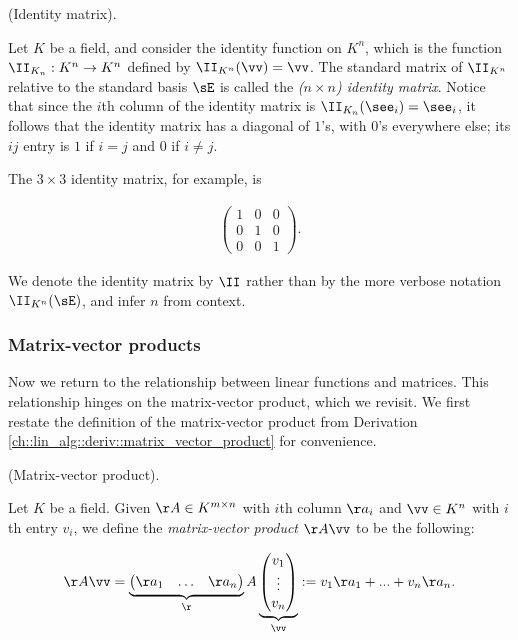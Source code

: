 \begin{defn}
    (Identity matrix).
    
    Let $K$ be a field, and consider the identity function on $K^n$, which is the function $\II_{K_n}:K^n \rightarrow K^n$ defined by $\II_{K^n}(\vv) = \vv$. The standard matrix of $\II_{K^n}$ relative to the standard basis $\sE$ is called the \textit{($n \times n$) identity matrix}. Notice that since the $i$th column of the identity matrix is $\II_{K_n}(\see_i) = \see_i$, it follows that the identity matrix has a diagonal of $1$'s, with $0$'s everywhere else; its $ij$ entry is $1$ if $i = j$ and $0$ if $i \neq j$. 
    
    The $3 \times 3$ identity matrix, for example, is
    
    \begin{align*}
        \begin{pmatrix}
            1 & 0 & 0 \\
            0 & 1 & 0 \\
            0 & 0 & 1
        \end{pmatrix}.
    \end{align*}
    
    We denote the identity matrix by $\II$ rather than by the more verbose notation $\II_{K^n}(\sE)$, and infer $n$ from context.
\end{defn}

\subsubsection{Matrix-vector products}

Now we return to the relationship between linear functions and matrices. This relationship hinges on the matrix-vector product, which we revisit. We first restate the definition of the matrix-vector product from Derivation \ref{ch::lin_alg::deriv::matrix_vector_product} for convenience.

\begin{defn}
    (Matrix-vector product).

    Let $K$ be a field. Given $\AA \in K^{m \times n}$ with $i$th column $\aa_i$ and $\vv \in K^n$ with $i$th entry $v_i$, we define the \textit{matrix-vector product} $\AA \vv$ to be the following:

    \begin{align*}
        \AA \vv =
        \underbrace
        {\begin{pmatrix} 
            \aa_1 & \hdots & \aa_n
        \end{pmatrix}}_\AA
        \underbrace{
        \begin{pmatrix} 
            v_1 \\ \vdots \\ v_n 
        \end{pmatrix}}_\vv
        :=
        v_1 \aa_1 + ... + v_n \aa_n.
    \end{align*}
\end{defn}

